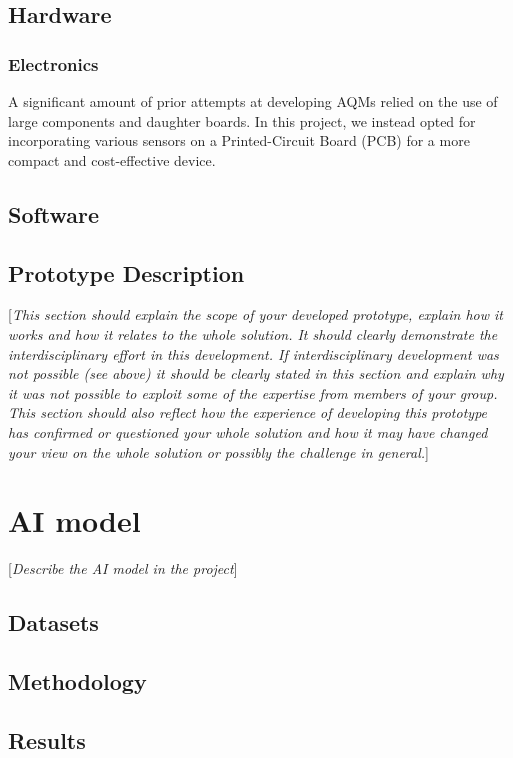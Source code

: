 \documentclass[10pt,english, openany]{book}
\begin{document}
\section{Hardware}

\subsection{Electronics}

A significant amount of prior attempts at developing AQMs relied on the use of large components and daughter boards. In this project, we instead opted for incorporating various sensors on a Printed-Circuit Board (PCB) for a more compact and cost-effective device. 

\section{Software}
\section{Prototype Description}
[\textit{This section should explain the scope of your developed prototype, explain how it works and how it relates to the whole solution. It should clearly demonstrate the interdisciplinary effort in this development. If interdisciplinary development was not possible (see above) it should be clearly stated in this section and explain why it was not possible to exploit some of the expertise from members of your group. This section should also reflect how the experience of developing this prototype has confirmed or questioned your whole solution and how it may have changed your view on the whole solution or possibly the challenge in general.}]

\chapter{AI model}\label{chapt:model}
[\textit{Describe the AI model in the project}]
\section{Datasets}
\section{Methodology}
\section{Results}
\end{document}

